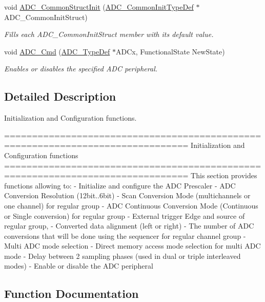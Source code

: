\begin{DoxyCompactItemize}
void \hyperlink{group___a_d_c___group1_gad60a6414b4932c704f6f7a7c2963fa2a}{A\+D\+C\+\_\+\+Common\+Struct\+Init} (\hyperlink{struct_a_d_c___common_init_type_def}{A\+D\+C\+\_\+\+Common\+Init\+Type\+Def} $\ast$A\+D\+C\+\_\+\+Common\+Init\+Struct)
\begin{DoxyCompactList}\small\item\em Fills each A\+D\+C\+\_\+\+Common\+Init\+Struct member with its default value. \end{DoxyCompactList}\item 
void \hyperlink{group___a_d_c___group1_ga40882d399e3371755ed610c1134e634e}{A\+D\+C\+\_\+\+Cmd} (\hyperlink{struct_a_d_c___type_def}{A\+D\+C\+\_\+\+Type\+Def} $\ast$A\+D\+Cx, Functional\+State New\+State)
\begin{DoxyCompactList}\small\item\em Enables or disables the specified A\+DC peripheral. \end{DoxyCompactList}\end{DoxyCompactItemize}


\subsection{Detailed Description}
Initialization and Configuration functions. 

\begin{DoxyVerb} ===============================================================================
                      Initialization and Configuration functions
 ===============================================================================  
  This section provides functions allowing to:
   - Initialize and configure the ADC Prescaler
   - ADC Conversion Resolution (12bit..6bit)
   - Scan Conversion Mode (multichannels or one channel) for regular group
   - ADC Continuous Conversion Mode (Continuous or Single conversion) for 
     regular group
   - External trigger Edge and source of regular group, 
   - Converted data alignment (left or right)
   - The number of ADC conversions that will be done using the sequencer for 
     regular channel group
   - Multi ADC mode selection
   - Direct memory access mode selection for multi ADC mode  
   - Delay between 2 sampling phases (used in dual or triple interleaved modes)
   - Enable or disable the ADC peripheral\end{DoxyVerb}
 

\subsection{Function Documentation}
